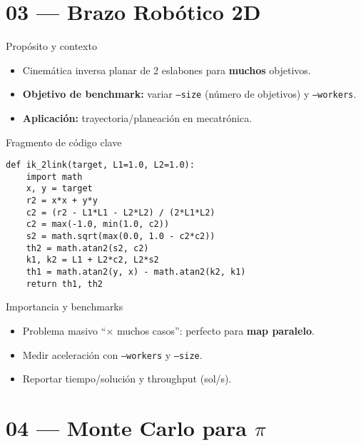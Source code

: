 \documentclass[aspectratio=169,professionalfonts]{beamer}
\begin{document}
\section{03 — Brazo Robótico 2D}

\begin{frame}{Propósito y contexto}
\begin{itemize}
  \item Cinemática inversa planar de 2 eslabones para \textbf{muchos} objetivos.
  \item \textbf{Objetivo de benchmark:} variar \texttt{--size} (número de objetivos) y \texttt{--workers}.
  \item \textbf{Aplicación:} trayectoria/planeación en mecatrónica.
\end{itemize}
\end{frame}

\begin{frame}[fragile]{Fragmento de código clave}
\begin{verbatim}
def ik_2link(target, L1=1.0, L2=1.0):
    import math
    x, y = target
    r2 = x*x + y*y
    c2 = (r2 - L1*L1 - L2*L2) / (2*L1*L2)
    c2 = max(-1.0, min(1.0, c2))
    s2 = math.sqrt(max(0.0, 1.0 - c2*c2))
    th2 = math.atan2(s2, c2)
    k1, k2 = L1 + L2*c2, L2*s2
    th1 = math.atan2(y, x) - math.atan2(k2, k1)
    return th1, th2
\end{verbatim}
\end{frame}

\begin{frame}{Importancia y benchmarks}
\begin{itemize}
  \item Problema masivo “\(\times\) muchos casos”: perfecto para \textbf{map paralelo}.
  \item Medir aceleración con \texttt{--workers} y \texttt{--size}.
  \item Reportar tiempo/solución y throughput (sol/s).
\end{itemize}
\end{frame}

\section{04 — Monte Carlo para \(\pi\)}
\end{document}

